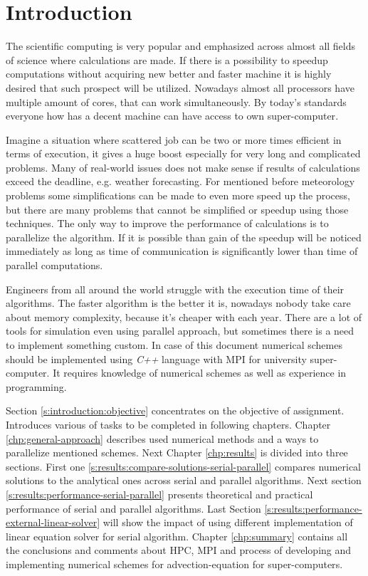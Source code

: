 \chapter{Introduction} \label{chp:introduction}
	The scientific computing is very popular and emphasized across almost all fields of science where calculations are made. If there is a possibility to speedup computations without acquiring new better and faster machine it is highly desired that such prospect will be utilized. Nowadays almost all processors have multiple amount of cores, that can work simultaneously. By today's standards everyone how has a decent machine can have access to own \gls{super-computer}.
	
	Imagine a situation where scattered job can be two or more times efficient in terms of execution, it gives a huge boost especially for very long and complicated problems. Many of real-world issues does not make sense if results of calculations exceed the deadline, e.g. weather forecasting. For mentioned before meteorology problems some simplifications can be made to even more speed up the process, but there are many problems that cannot be simplified or speedup using those techniques. The only way to improve the performance of calculations is to parallelize the algorithm. If it is possible than gain of the speedup will be noticed immediately as long as time of communication is significantly lower than time of parallel computations.	 
	
	Engineers from all around the world struggle with the execution time of their algorithms. The faster algorithm is the better it is, nowadays nobody take care about memory complexity, because it's cheaper with each year. There are a lot of tools for simulation even using parallel approach, but sometimes there is a need to implement something custom. In case of this document numerical schemes should be implemented using \emph{C++} language with \gls{MPI} for university \gls{super-computer}. It requires knowledge of numerical schemes as well as experience in programming.
	
	Section \ref{s:introduction:objective} concentrates on the objective of assignment. Introduces various of tasks to be completed in following chapters. Chapter \ref{chp:general-approach} describes used numerical methods and a ways to parallelize mentioned schemes. Next Chapter \ref{chp:results} is divided into three sections. First one \ref{s:results:compare-solutions-serial-parallel} compares numerical solutions to the analytical ones across serial and parallel algorithms. Next section \ref{s:results:performance-serial-parallel} presents theoretical and practical performance of serial and parallel algorithms. Last Section \ref{s:results:performance-external-linear-solver} will show the impact of using different implementation of linear equation solver for serial algorithm. Chapter \ref{chp:summary} contains all the conclusions and comments about \gls{HPC}, \gls{MPI} and process of developing and implementing numerical schemes for \gls{advection-equation} for \gls{super-computer}s. 
	
	
	